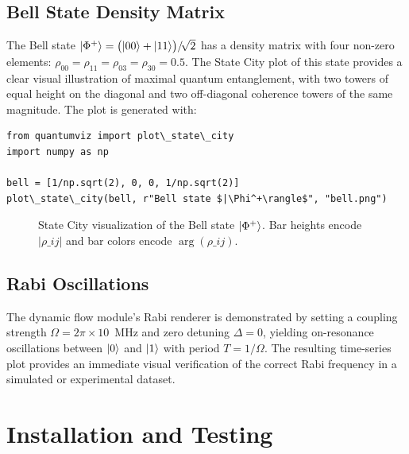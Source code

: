 \documentclass{SciPost}
\begin{document}
\subsection{Bell State Density Matrix}

The Bell state
$\ket{\Phi^+} = \bigl(\ket{00} + \ket{11}\bigr)/\!\sqrt{2}$
has a density matrix with four non-zero elements:
$\rho_{00} = \rho_{11} = \rho_{03} = \rho_{30} = 0.5$.
The State City plot of this state provides a clear visual illustration of
maximal quantum entanglement, with two towers of equal height on the diagonal
and two off-diagonal coherence towers of the same magnitude.
The plot is generated with:
\begin{lstlisting}
from quantumviz import plot\_state\_city
import numpy as np

bell = [1/np.sqrt(2), 0, 0, 1/np.sqrt(2)]
plot\_state\_city(bell, r"Bell state $|\Phi^+\rangle$", "bell.png")
\end{lstlisting}

\begin{figure}[h]
\centering
{}
\caption{State City visualization of the Bell state $\ket{\Phi^+}$.
         Bar heights encode $|\rho\_{ij}|$ and bar colors encode
         $\arg(\rho\_{ij})$.}
\label{fig:statecity}
\end{figure}

\subsection{Rabi Oscillations}

The dynamic flow module's Rabi renderer is demonstrated by setting a coupling
strength $\Omega = 2\pi \times 10$~MHz and zero detuning $\Delta = 0$,
yielding on-resonance oscillations between $\ket{0}$ and $\ket{1}$ with
period $T = 1/\Omega$.
The resulting time-series plot provides an immediate visual verification of
the correct Rabi frequency in a simulated or experimental dataset.

\section{Installation and Testing}
\label{sec:installation}
\end{document}
